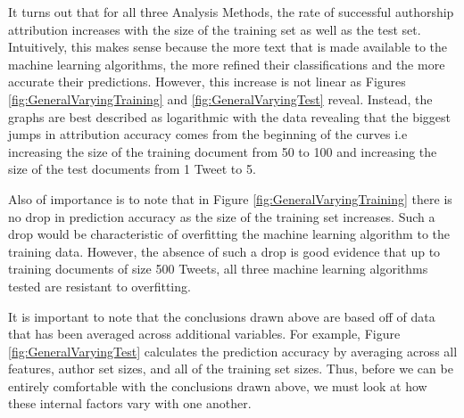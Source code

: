 \documentclass[pageno]{jpaper}
\begin{document}
It turns out that for all three Analysis Methods, the rate of successful authorship attribution increases with the size of the training set as well as the test set.  Intuitively, this makes sense because the more text that is made available to the machine learning algorithms, the more refined their classifications and the more accurate their predictions.  However, this increase is not linear as Figures \ref{fig:GeneralVaryingTraining} and  \ref{fig:GeneralVaryingTest} reveal.  Instead, the graphs are best described as logarithmic with the data revealing that the biggest jumps in attribution accuracy comes from the beginning of the curves i.e increasing the size of the training document from 50 to 100 and increasing the size of the test documents from 1 Tweet to 5.

Also of importance is to note that in Figure \ref{fig:GeneralVaryingTraining} there is no drop in prediction accuracy as the size of the training set increases.  Such a drop would be characteristic of overfitting the machine learning algorithm to the training data.  However, the absence of such a drop is good evidence that up to training documents of size 500 Tweets, all three machine learning algorithms tested are resistant to overfitting.

It is important to note that the conclusions drawn above are based off of data that has been averaged across additional variables.  For example, Figure \ref{fig:GeneralVaryingTest} calculates the prediction accuracy by averaging across all features, author set sizes, and all of the training set sizes.  Thus, before we can be entirely comfortable with the conclusions drawn above, we must look at how these internal factors vary with one another.
\end{document}
